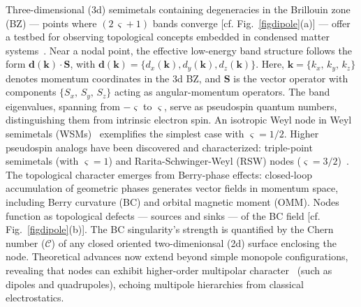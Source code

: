 \documentclass[aps,prb,onecolumn, footinbib, 10pt]{revtex4-2}
\begin{document}
Three-dimensional (3d) semimetals containing degeneracies in the Brillouin zone (BZ) --- points where $(2\, \varsigma + 1)$ bands converge [cf.
Fig.~\ref{figdipole}(a)] --- offer a testbed for observing topological concepts embedded in condensed matter systems~\cite{burkov11_Weyl, hosur1, armitage_review, hosur-review, yan17_topological, ips-kush-review, bernevig, bernevig2, grushin-multifold, claudia-multifold}. Near a nodal point, the effective low-energy band structure follows the form
$ \boldsymbol d( \boldsymbol{k} ) \cdot \boldsymbol {S } $, with
$\boldsymbol d( \boldsymbol{k} ) = 
\lbrace d_x ( \boldsymbol{k} ) , d_y ( \boldsymbol{k} ) , d_z ( \boldsymbol{k} )  
 \rbrace.$
Here, $\boldsymbol k = \lbrace k_x, \,k_y, \,  k_z  \rbrace$ denotes momentum coordinates in the 3d BZ, and $\boldsymbol {S}$ is the vector operator with components $ \lbrace S_x, \,S_y, \,  S_z  \rbrace $ acting as angular-momentum operators. The band eigenvalues, spanning from $- \varsigma $ to $ \varsigma $, serve as pseudospin quantum numbers, distinguishing them from intrinsic electron spin.
An isotropic Weyl node in Weyl semimetals (WSMs)~\cite{burkov11_Weyl, armitage_review, yan17_topological} exemplifies the simplest case with $\varsigma = 1/2$. Higher pseudospin analogs have been discovered and characterized: triple-point semimetals (with $\varsigma = 1 $) and Rarita-Schwinger-Weyl (RSW) nodes ($\varsigma = 3/2$)~\cite{bernevig, long, isobe-fu,  tang2017_multiple, ma2021_observation, prb108035428, grushin-multifold, ips-rsw-ph, ips-shreya, ips-exact-rsw}. The topological character emerges from Berry-phase effects: closed-loop accumulation of geometric phases generates vector fields in momentum space, including Berry curvature (BC) and orbital magnetic moment (OMM). Nodes function as topological defects --- sources and sinks --- of the BC field [cf. Fig.~\ref{figdipole}(b)]. The BC singularity's strength is quantified by the Chern number ($\mathcal C$) of any closed oriented two-dimenionsal (2d) surface enclosing the node. Theoretical advances now extend beyond simple monopole configurations, revealing that nodes can exhibit higher-order multipolar character~\cite{twoband-dipole, graf-hopf, hopf2, hopf3} (such as dipoles and quadrupoles), echoing multipole hierarchies from classical electrostatics.
\end{document}
